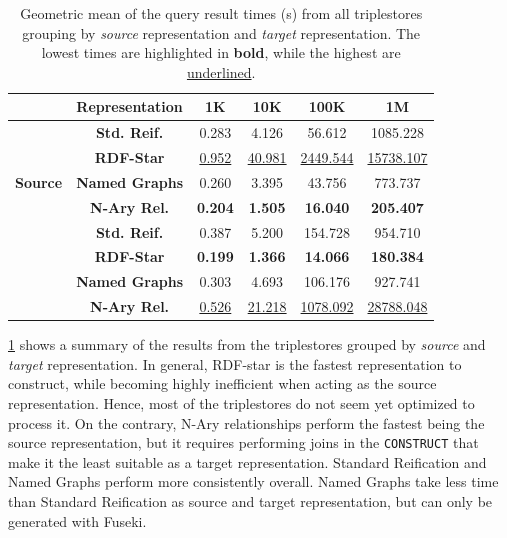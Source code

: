 \begin{table}[t!]
\caption{Geometric mean of the query result times (s) from all triplestores grouping by \textit{source} representation and \textit{target} representation. The lowest times are highlighted in \textbf{bold}, while the highest are \underline{underlined}.}
\centering
\label{tab:chp6-1_closeup-queries}
\begin{tabular}{cccccc}
    \cmidrule{2-6}
 & \textbf{Representation} & \textbf{1K} & \textbf{10K} & \textbf{100K} & \textbf{1M} \\ \midrule
 \multirow{5}{*}{\textbf{Source}} & \textbf{Std. Reif.} & 0.283 & 4.126 & 56.612 & 1085.228  \\ \cmidrule{2-6}
  & \textbf{RDF-Star} & \underline{0.952} & \underline{40.981} & \underline{2449.544} & \underline{15738.107}  \\ \cmidrule{2-6}
  & \textbf{Named Graphs} & 0.260 & 3.395 & 43.756 & 773.737 \\ \cmidrule{2-6}
 & \textbf{N-Ary Rel.} & \textbf{0.204} & \textbf{1.505} & \textbf{16.040} & \textbf{205.407}  \\ \midrule
 \multirow{5}{*}{\textbf{Target}} & \textbf{Std. Reif.} & 0.387 & 5.200 & 154.728 & 954.710  \\ \cmidrule{2-6}
  & \textbf{RDF-Star} & \textbf{0.199} & \textbf{1.366} & \textbf{14.066} & \textbf{180.384} \\ \cmidrule{2-6}
  & \textbf{Named Graphs}  & 0.303 & 4.693 & 106.176 & 927.741 \\ \cmidrule{2-6}
 \ & \textbf{N-Ary Rel.} & \underline{0.526} & \underline{21.218} & \underline{1078.092} & \underline{28788.048} \\   \bottomrule
\end{tabular}
\end{table}

\cref{tab:chp6-1_closeup-queries} shows a summary of the results from the triplestores grouped by \textit{source} and \textit{target} representation. In general, RDF-star is the fastest representation to construct, while becoming highly inefficient when acting as the source representation. Hence, most of the triplestores do not seem yet optimized to process it. On the contrary, N-Ary relationships perform the fastest being the source representation, but it requires performing joins in the \texttt{CONSTRUCT} that make it the least suitable as a target representation. Standard Reification and Named Graphs perform more consistently overall. Named Graphs take less time than Standard Reification as source and target representation, but can only be generated with Fuseki. 

